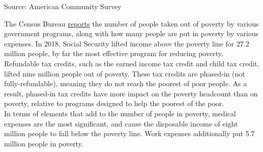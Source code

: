 \documentclass{report}
\begin{document}
{{{{{\vspace{-3mm}
\hspace{-15mm} 

\vspace{-5mm}
\footnotesize{Source: American Community Survey}


\newpage

\begin{minipage}{0.76\textwidth}


\small The Census Bureau \href{https://www.census.gov/library/publications/2019/demo/p60-268.html}{reports} the number of people taken out of poverty by various government programs, along with how many people are put in poverty by various expenses. In 2018, Social Security lifted income above the poverty line for 27.2 million people, by far the most effective program for reducing poverty. Refundable tax credits, such as the earned income tax credit and child tax credit, lifted nine million people out of poverty. These tax credits are phased-in (not fully-refundable), meaning they do not reach the poorest of poor people. As a result, phased-in tax credits have more impact on the poverty headcount than on poverty, relative to programs designed to help the poorest of the poor.\\

In terms of elements that add to the number of people in poverty, medical expenses are the most significant, and cause the disposable income of eight million people to fall below the poverty line. Work expenses additionally put 5.7 million people in poverty.\\

\vspace{2mm}


\end{minipage}}}}}}
\end{document}
